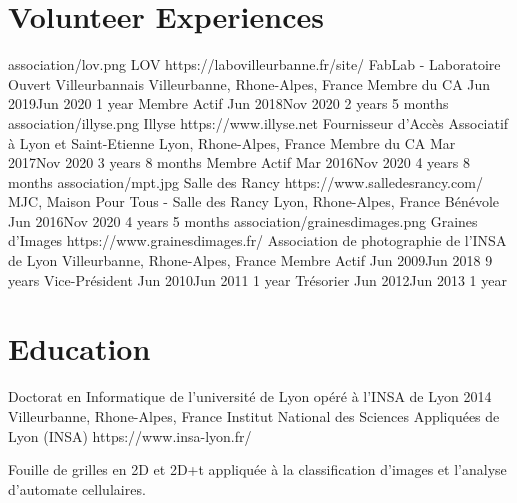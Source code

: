 \documentclass[
  paper=a4,
  fontsize=10pt
]{resume}
\begin{document}
{{{{  \section[\fa{hands-helping}]{Volunteer Experiences}%
    \vspace{-1em}
      \volunteerorganization
        {association/lov.png}
        {LOV}
        {https://labovilleurbanne.fr/site/}
        {FabLab - Laboratoire Ouvert Villeurbannais}
        {Villeurbanne, Rhone-Alpes, France}
        {
        \volunteerposition
          {Membre du CA}
          {Jun 2019\textendash Jun 2020}
          {1 year}
          {}
        \volunteerposition
          {Membre Actif}
          {Jun 2018\textendash Nov 2020}
          {2 years 5 months}
          {}
        }
      \volunteerorganization
        {association/illyse.png}
        {Illyse}
        {https://www.illyse.net}
        {Fournisseur d'Accès Associatif à Lyon et Saint-Etienne}
        {Lyon, Rhone-Alpes, France}
        {
        \volunteerposition
          {Membre du CA}
          {Mar 2017\textendash Nov 2020}
          {3 years 8 months}
          {}
        \volunteerposition
          {Membre Actif}
          {Mar 2016\textendash Nov 2020}
          {4 years 8 months}
          {}
        }
      \volunteerorganization
        {association/mpt.jpg}
        {Salle des Rancy}
        {https://www.salledesrancy.com/}
        {MJC, Maison Pour Tous - Salle des Rancy}
        {Lyon, Rhone-Alpes, France}
        {
        \volunteerposition
          {Bénévole}
          {Jun 2016\textendash Nov 2020}
          {4 years 5 months}
          {}
        }
      \volunteerorganization
        {association/grainesdimages.png}
        {Graines d'Images}
        {https://www.grainesdimages.fr/}
        {Association de photographie de l'INSA de Lyon}
        {Villeurbanne, Rhone-Alpes, France}
        {
        \volunteerposition
          {Membre Actif}
          {Jun 2009\textendash Jun 2018}
          {9 years}
          {}
        \volunteerposition
          {Vice-Président}
          {Jun 2010\textendash Jun 2011}
          {1 year}
          {}
        \volunteerposition
          {Trésorier}
          {Jun 2012\textendash Jun 2013}
          {1 year}
          {}
        }
  \section[\fa{graduation-cap}]{Education}
    \schooldiploma
      {Doctorat en Informatique de l'université de Lyon opéré à l'INSA de Lyon}
      {2014}
      {Villeurbanne, Rhone-Alpes, France}
      {Institut National des Sciences Appliquées de Lyon (INSA)}
      {https://www.insa-lyon.fr/}
      {
        Fouille de grilles en 2D et 2D+t appliquée à la classification d'images et l'analyse d'automate cellulaires.

}}}}}
\end{document}
